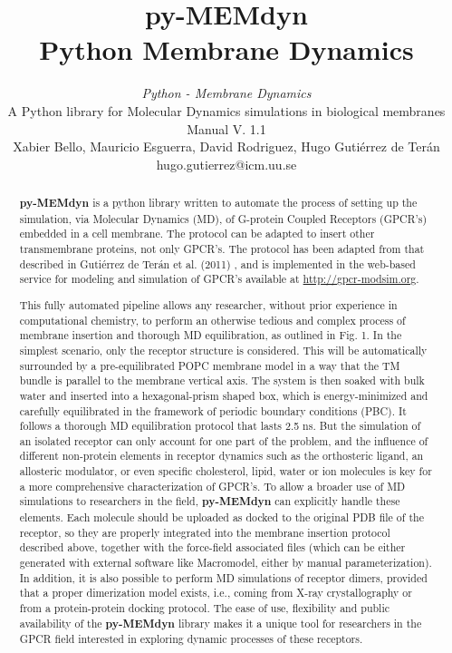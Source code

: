 \documentclass[10pt, oneside, pdftex]{article}
\title{py-MEMdyn \\ 
\large \vspace*{-10pt}Python Membrane Dynamics\vspace*{10pt}}
\author{%
\textit{Python - Membrane Dynamics} \\
A Python library for Molecular Dynamics simulations in biological membranes\\
Manual V. 1.1 \\
Xabier Bello, Mauricio Esguerra, David Rodriguez, Hugo Guti\'{e}rrez de Ter\'{a}n \\
hugo.gutierrez@icm.uu.se \\
\vspace{20pt}
}
\makeatletter
\def\printtitle{%
{\color{bl} \centering \huge  \textbf{\@title}\par}}	%
\def\printauthor{%
{\centering \small \@author}}				%
\makeatother
\begin{document}
\printtitle 
\printauthor

\begin{abstract}
\noindent \textbf{py-MEMdyn}  is a python library  written to automate
the process of setting up the simulation, via Molecular Dynamics (MD),
of G-protein  Coupled Receptors (GPCR's) embedded in  a cell membrane.
The protocol  can be adapted  to insert other  transmembrane proteins,
not only GPCR's.  The protocol has been adapted from that described in
Guti\'{e}rrez de  Ter\'{a}n et al.  (2011) \cite{rodriguez2011}, and is  implemented in
the web-based service for  modeling and simulation of GPCR's available
at \url{http://gpcr-modsim.org}.

This  fully automated  pipeline allows  any researcher,  without prior
experience in computational chemistry, to perform an otherwise tedious
and   complex  process   of   membrane  insertion   and  thorough   MD
equilibration, as outlined  in Fig. 1. In the  simplest scenario, only
the  receptor structure  is  considered.  This  will be  automatically
surrounded by a  pre-equilibrated POPC membrane model in  a way that the
TM bundle  is parallel  to the membrane  vertical axis. The  system is
then soaked with bulk water and inserted into a hexagonal-prism shaped
box,  which  is energy-minimized  and  carefully  equilibrated in  the
framework of periodic boundary conditions (PBC). It follows a thorough
MD equilibration protocol that lasts  2.5 ns. But the simulation of an
isolated receptor  can only account for  one part of  the problem, and
the influence  of different non-protein elements  in receptor dynamics
such  as the  orthosteric ligand,  an allosteric modulator,  or even
specific cholesterol, lipid, water or  ion molecules is key for a more
comprehensive characterization of GPCR's. To allow a broader use of MD
simulations  to  researchers  in  the  field,  \textbf{py-MEMdyn}  can
explicitly handle these elements.  Each molecule should be uploaded as
docked to the original PDB file  of the receptor, so they are properly
integrated  into  the  membrane  insertion protocol  described  above,
together with  the force-field associated  files (which can  be either
generated  with external  software like  Macromodel, either  by manual
parameterization).   In addition, it  is also  possible to  perform MD
simulations of  receptor dimers,  provided that a  proper dimerization
model  exists,  i.e., coming  from  X-ray  crystallography  or from  a
protein-protein docking  protocol.  The  ease of use,  flexibility and
public  availability  of the  \textbf{py-MEMdyn}  library  makes it  a
unique tool for researchers in  the GPCR field interested in exploring
dynamic processes of these receptors.
\end{abstract}
\end{document}

